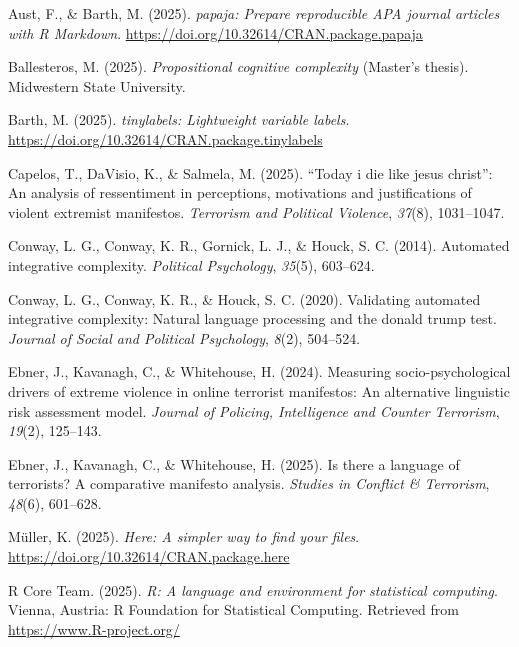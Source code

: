 \documentclass[
  english,
  man,floatsintext]{apa6}
\newlength{\cslhangindent}
\newenvironment{CSLReferences}[2] %
 {\begin{list}{}{%
  \setlength{\itemindent}{0pt}
  \setlength{\leftmargin}{0pt}
  \setlength{\parsep}{0pt}
  \ifodd #1
   \setlength{\leftmargin}{\cslhangindent}
   \setlength{\itemindent}{-1\cslhangindent}
  \fi
  \setlength{\itemsep}{#2\baselineskip}}}
 {\end{list}}
\begin{document}
\label{refs}
\begin{CSLReferences}{1}{0}
Aust, F., \& Barth, M. (2025). \emph{{papaja}: {Prepare} reproducible {APA} journal articles with {R Markdown}}. \url{https://doi.org/10.32614/CRAN.package.papaja}

Ballesteros, M. (2025). \emph{Propositional cognitive complexity} (Master's thesis). Midwestern State University.

Barth, M. (2025). \emph{{tinylabels}: Lightweight variable labels}. \url{https://doi.org/10.32614/CRAN.package.tinylabels}

Capelos, T., DaVisio, K., \& Salmela, M. (2025). {``Today i die like jesus christ''}: An analysis of ressentiment in perceptions, motivations and justifications of violent extremist manifestos. \emph{Terrorism and Political Violence}, \emph{37}(8), 1031--1047.

Conway, L. G., Conway, K. R., Gornick, L. J., \& Houck, S. C. (2014). Automated integrative complexity. \emph{Political Psychology}, \emph{35}(5), 603--624.

Conway, L. G., Conway, K. R., \& Houck, S. C. (2020). Validating automated integrative complexity: Natural language processing and the donald trump test. \emph{Journal of Social and Political Psychology}, \emph{8}(2), 504--524.

Ebner, J., Kavanagh, C., \& Whitehouse, H. (2024). Measuring socio-psychological drivers of extreme violence in online terrorist manifestos: An alternative linguistic risk assessment model. \emph{Journal of Policing, Intelligence and Counter Terrorism}, \emph{19}(2), 125--143.

Ebner, J., Kavanagh, C., \& Whitehouse, H. (2025). Is there a language of terrorists? A comparative manifesto analysis. \emph{Studies in Conflict \& Terrorism}, \emph{48}(6), 601--628.

Müller, K. (2025). \emph{Here: A simpler way to find your files}. \url{https://doi.org/10.32614/CRAN.package.here}

R Core Team. (2025). \emph{R: A language and environment for statistical computing}. Vienna, Austria: R Foundation for Statistical Computing. Retrieved from \url{https://www.R-project.org/}


\end{CSLReferences}
\end{document}
